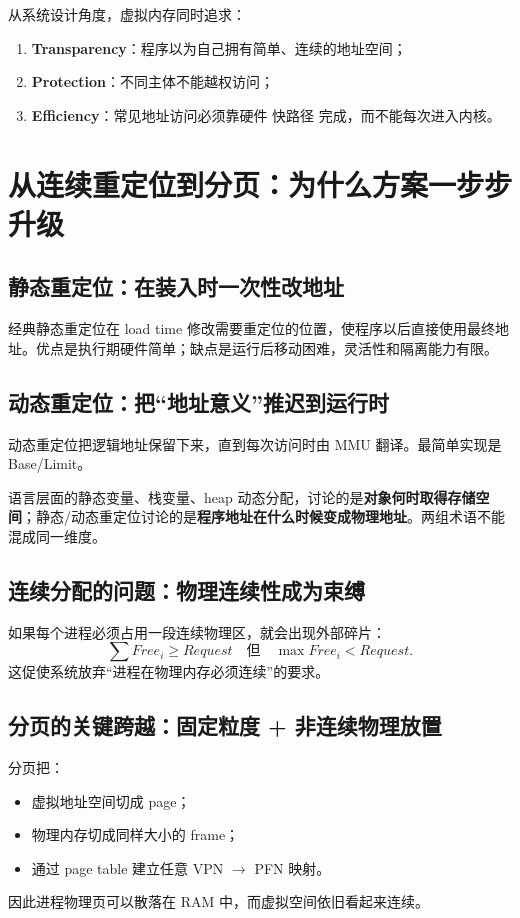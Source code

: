 \documentclass[11pt,a4paper]{ctexart}
\newcommand{\kw}[1]{\textbf{#1}}
\begin{document}
\begin{bridge}[虚拟内存的三个最重要目标]
从系统设计角度，虚拟内存同时追求：
\begin{enumerate}
  \item \kw{Transparency}：程序以为自己拥有简单、连续的地址空间；
  \item \kw{Protection}：不同主体不能越权访问；
  \item \kw{Efficiency}：常见地址访问必须靠硬件 快路径 完成，而不能每次进入内核。
\end{enumerate}
\end{bridge}

\section{从连续重定位到分页：为什么方案一步步升级}

\subsection{静态重定位：在装入时一次性改地址}
经典静态重定位在 load time 修改需要重定位的位置，使程序以后直接使用最终地址。优点是执行期硬件简单；缺点是运行后移动困难，灵活性和隔离能力有限。

\subsection{动态重定位：把“地址意义”推迟到运行时}
动态重定位把逻辑地址保留下来，直到每次访问时由 MMU 翻译。最简单实现是 Base/Limit。

\begin{exam}
语言层面的静态变量、栈变量、heap 动态分配，讨论的是\kw{对象何时取得存储空间}；静态/动态重定位讨论的是\kw{程序地址在什么时候变成物理地址}。两组术语不能混成同一维度。
\end{exam}

\subsection{连续分配的问题：物理连续性成为束缚}
如果每个进程必须占用一段连续物理区，就会出现外部碎片：
\[
\sum Free_i \ge Request
\quad\text{但}\quad
\max Free_i<Request.
\]
这促使系统放弃“进程在物理内存必须连续”的要求。

\subsection{分页的关键跨越：固定粒度 + 非连续物理放置}
分页把：
\begin{itemize}
  \item 虚拟地址空间切成 page；
  \item 物理内存切成同样大小的 frame；
  \item 通过 page table 建立任意 VPN $\to$ PFN 映射。
\end{itemize}
因此进程物理页可以散落在 RAM 中，而虚拟空间依旧看起来连续。
\end{document}
